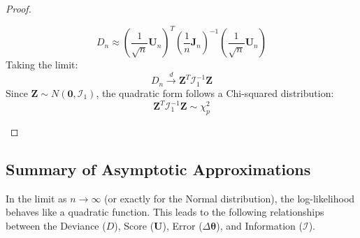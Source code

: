 \documentclass[
  letterpaper,
  DIV=11,
  numbers=noendperiod]{scrreprt}
\renewcommand{\[}{\begin{equation}}
\renewcommand{\]}{\end{equation}}
\theoremstyle{definition}
\theoremstyle{plain}
\theoremstyle{plain}
\theoremstyle{plain}
\theoremstyle{definition}
\theoremstyle{plain}
\theoremstyle{remark}
\begin{document}
\begin{proof}
\begin{enumerate}
  \[
   D_n \approx \left( \frac{1}{\sqrt{n}} \mathbf{U}_n \right)^T \left( \frac{1}{n} \mathbf{J}_n \right)^{-1} \left( \frac{1}{\sqrt{n}} \mathbf{U}_n \right)
   \] Taking the limit: \[
   D_n \xrightarrow{d} \mathbf{Z}^T \mathcal{I}_1^{-1} \mathbf{Z}
   \] Since \(\mathbf{Z} \sim N(\mathbf{0}, \mathcal{I}_1)\), the
  quadratic form follows a Chi-squared distribution: \[
   \mathbf{Z}^T \mathcal{I}_1^{-1} \mathbf{Z} \sim \chi^2_p
   \]
\end{enumerate}

\end{proof}

\subsection{Summary of Asymptotic
Approximations}\label{summary-of-asymptotic-approximations}

In the limit as \(n \to \infty\) (or exactly for the Normal
distribution), the log-likelihood behaves like a quadratic function.
This leads to the following relationships between the Deviance (\(D\)),
Score (\(\mathbf{U}\)), Error (\(\Delta \boldsymbol{\theta}\)), and
Information (\(\mathcal{I}\)).
\end{document}
